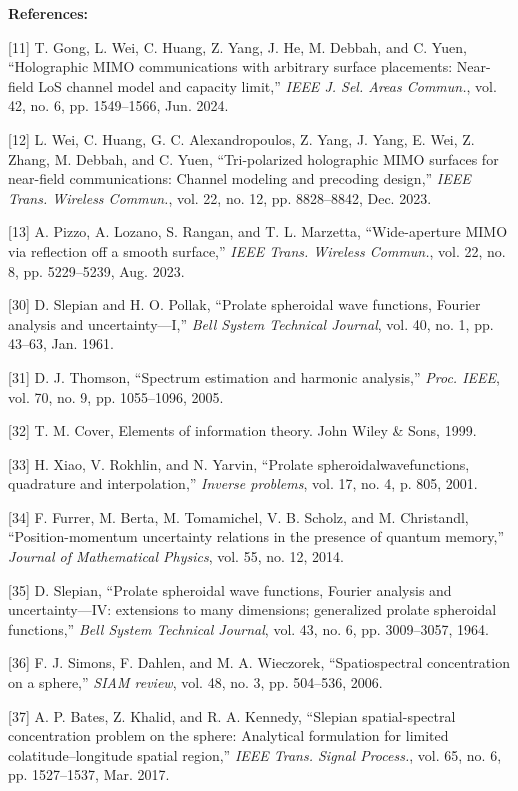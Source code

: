\documentclass[a4paper,12pt]{article}
\begin{document}
{\color{blue}
	{\bf References:}
	
	[11] T. Gong, L. Wei, C. Huang, Z. Yang, J. He, M. Debbah, and C. Yuen, “Holographic MIMO communications with arbitrary surface
	placements: Near-field LoS channel model and capacity limit,” {\it IEEE J. Sel. Areas Commun.}, vol. 42, no. 6, pp. 1549–1566, Jun.
	2024.
	
	[12] L. Wei, C. Huang, G. C. Alexandropoulos, Z. Yang, J. Yang, E. Wei, Z. Zhang, M. Debbah, and C. Yuen, “Tri-polarized holographic
	MIMO surfaces for near-field communications: Channel modeling and precoding design,” {\it IEEE Trans. Wireless Commun.}, vol. 22,
	no. 12, pp. 8828–8842, Dec. 2023.
	
	[13] A. Pizzo, A. Lozano, S. Rangan, and T. L. Marzetta, “Wide-aperture MIMO via reflection off a smooth surface,” {\it IEEE Trans.
	Wireless Commun.}, vol. 22, no. 8, pp. 5229–5239, Aug. 2023.
	
	[30] D. Slepian and H. O. Pollak, “Prolate spheroidal wave functions, Fourier analysis and uncertainty—I,” {\it Bell System Technical
	Journal}, vol. 40, no. 1, pp. 43–63, Jan. 1961.
	
	[31] D. J. Thomson, “Spectrum estimation and harmonic analysis,” {\it Proc. IEEE}, vol. 70, no. 9, pp. 1055–1096, 2005.
	
	[32] T. M. Cover, Elements of information theory. John Wiley \& Sons, 1999.
	
	[33] H. Xiao, V. Rokhlin, and N. Yarvin, “Prolate spheroidalwavefunctions, quadrature and interpolation,” {\it Inverse problems}, vol. 17,
	no. 4, p. 805, 2001.
	
	[34] F. Furrer, M. Berta, M. Tomamichel, V. B. Scholz, and M. Christandl, “Position-momentum uncertainty relations in the presence
	of quantum memory,” {\it Journal of Mathematical Physics}, vol. 55, no. 12, 2014.
	
	[35] D. Slepian, “Prolate spheroidal wave functions, Fourier analysis and uncertainty—IV: extensions to many dimensions; generalized
	prolate spheroidal functions,” {\it Bell System Technical Journal}, vol. 43, no. 6, pp. 3009–3057, 1964.
	
	[36] F. J. Simons, F. Dahlen, and M. A. Wieczorek, “Spatiospectral concentration on a sphere,” {\it SIAM review}, vol. 48, no. 3, pp. 504–536,
	2006.
	
	[37] A. P. Bates, Z. Khalid, and R. A. Kennedy, “Slepian spatial-spectral concentration problem on the sphere: Analytical formulation
	for limited colatitude–longitude spatial region,” {\it IEEE Trans. Signal Process.}, vol. 65, no. 6, pp. 1527–1537, Mar. 2017.
	
}
\end{document}
